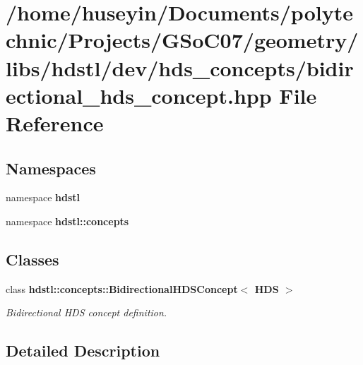 \section{/home/huseyin/Documents/polytechnic/Projects/GSo\-C07/geometry/libs/hdstl/dev/hds\_\-concepts/bidirectional\_\-hds\_\-concept.hpp File Reference}
\label{bidirectional__hds__concept_8hpp}
\subsection*{Namespaces}
\begin{CompactItemize}
\item 
namespace \textbf{hdstl}
\item 
namespace \textbf{hdstl::concepts}
\end{CompactItemize}
\subsection*{Classes}
\begin{CompactItemize}
\item 
class \bf{hdstl::concepts::Bidirectional\-HDSConcept$<$ HDS $>$}
\begin{CompactList}\small\item\em Bidirectional HDS concept definition. \item\end{CompactList}\end{CompactItemize}


\subsection{Detailed Description}
